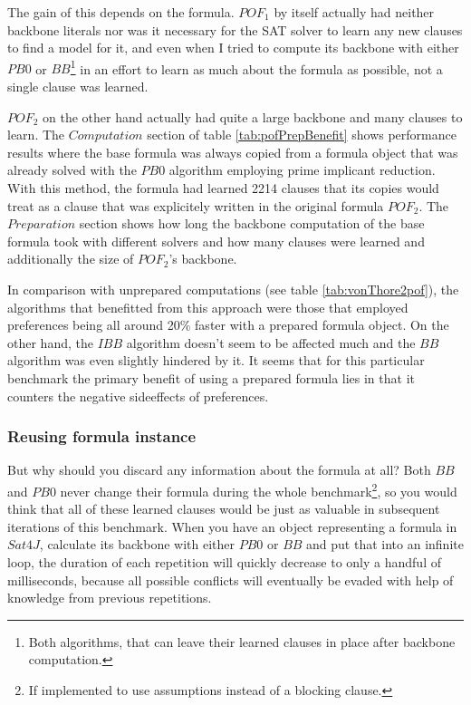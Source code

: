 The gain of this depends on the formula. $POF_1$ by itself actually had neither backbone literals %
nor was it necessary for the SAT solver to learn any new clauses to find a model for it, and even when I tried to compute its backbone with either $PB0$ or $BB$\footnote{Both algorithms, that can leave their learned clauses in place after backbone computation.} in an effort to learn as much about the formula as possible, not a single clause was learned.

$POF_2$ on the other hand actually had quite a large backbone and many clauses to learn. The $Computation$ section of table \ref{tab:pofPrepBenefit} shows performance results where the base formula was always copied from a formula object that was already solved with the $PB0$ algorithm employing prime implicant reduction. With this method, the formula had learned 2214 clauses that its copies would treat as a clause that was explicitely written in the original formula $POF_2$. The $Preparation$ section shows how long the backbone computation of the base formula took with different solvers and how many clauses were learned and additionally the size of $POF_2$'s backbone.

In comparison with unprepared computations (see table \ref{tab:vonThore2pof}), the algorithms that benefitted from this approach were those that employed preferences being all around 20\% faster with a prepared formula object. On the other hand, the $IBB$ algorithm doesn't seem to be affected much and the $BB$ algorithm was even slightly hindered by it. It seems that for this particular benchmark the primary benefit of using a prepared formula lies in that it counters the negative sideeffects of preferences.




\subsubsection{Reusing formula instance}
But why should you discard any information about the formula at all? Both $BB$ and $PB0$ never change their formula during the whole benchmark\footnote{If implemented to use assumptions instead of a blocking clause.}, so you would think that all of these learned clauses would be just as valuable in subsequent iterations of this benchmark. When you have an object representing a formula in $Sat4J$, calculate its backbone with either $PB0$ or $BB$ and put that into an infinite loop, the duration of each repetition will quickly decrease to only a handful of milliseconds, because all possible conflicts will eventually be evaded with help of knowledge from previous repetitions.


